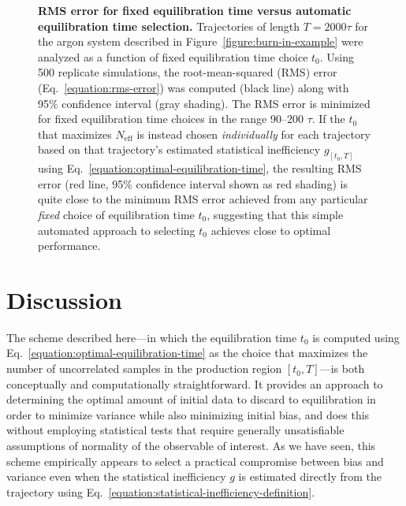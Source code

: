 \documentclass[aps,pre,twocolumn,nofootinbib,superscriptaddress,linenumbers,11point]{revtex4-1}
\begin{document}
\begin{figure}[tbp]
\caption{\label{figure:argon-rmse} {\bf RMS error for fixed equilibration time versus automatic equilibration time selection.} 
Trajectories of length $T = 2000 \tau$ for the argon system described in Figure~\ref{figure:burn-in-example} were analyzed as a function of fixed equilibration time choice $t_0$.
Using 500 replicate simulations, the root-mean-squared (RMS) error (Eq.~\ref{equation:rms-error}) was computed (black line) along with 95\% confidence interval (gray shading).
The RMS error is minimized for fixed equilibration time choices in the range 90--200 $\tau$.
If the $t_0$ that maximizes $N_\mathrm{eff}$ is instead chosen \emph{individually} for each trajectory based on that trajectory's estimated statistical inefficiency $g_{[t_0,T]}$ using Eq.~\ref{equation:optimal-equilibration-time}, the resulting RMS error (red line, 95\% confidence interval shown as red shading) is quite close to the minimum RMS error achieved from any particular \emph{fixed} choice of equilibration time $t_0$, suggesting that this simple automated approach to selecting $t_0$ achieves close to optimal performance.
}
\end{figure}


\section*{Discussion}
\label{section:discussion}

The scheme described here---in which the equilibration time $t_0$ is computed using Eq.~\ref{equation:optimal-equilibration-time} as the choice that maximizes the number of uncorrelated samples in the production region $[t_0,T]$---is both conceptually and computationally straightforward.
It provides an approach to determining the optimal amount of initial data to discard to equilibration in order to minimize variance while also minimizing initial bias, and does this without employing statistical tests that require generally unsatisfiable assumptions of normality of the observable of interest.
As we have seen, this scheme empirically appears to select a practical compromise between bias and variance even when the statistical inefficiency $g$ is estimated directly from the trajectory using Eq.~\ref{equation:statistical-inefficiency-definition}.
\end{document}
